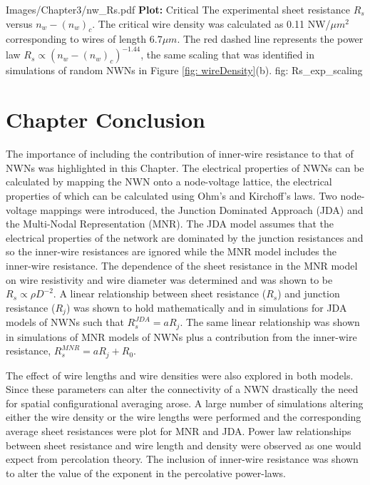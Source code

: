 {Images/Chapter3/nw_Rs.pdf}
{\textbf{Plot:} Critical}
{The experimental sheet resistance $R_s$ versus $n_w - (n_w)_c$. The critical wire density was calculated as 0.11 NW/$\mu m^2$ corresponding to wires of length $6.7 \mu m$. The red dashed line represents the power law  $R_s \propto (n_w - (n_w)_c)^{-1.44}$, the same scaling that was identified in simulations of random NWNs in Figure \ref{fig: wireDensity}(b).}
{fig: Rs_exp_scaling}

\section{Chapter Conclusion}
\label{sec:Conclusion}
The importance of including the contribution of inner-wire resistance to that of NWNs was highlighted in this Chapter. The electrical properties of NWNs can be calculated by mapping the NWN onto a node-voltage lattice, the electrical properties of which can be calculated using Ohm's and Kirchoff's laws. Two node-voltage mappings were introduced, the Junction Dominated Approach (JDA) and the Multi-Nodal Representation (MNR). The JDA model assumes that the electrical properties of the network are dominated by the junction resistances and so the inner-wire resistances are ignored while the MNR model includes the inner-wire resistance. The dependence of the sheet resistance in the MNR model on wire resistivity and wire diameter was determined and was shown to be $R_s \propto \rho D^{-2}$. A linear relationship between sheet resistance ($R_s$) and junction resistance ($R_j$) was shown to hold mathematically and in simulations for JDA models of NWNs such that $R_s^{JDA} = a R_j$. The same linear relationship was shown in simulations of MNR models of NWNs plus a contribution from the inner-wire resistance,  $R_s^{MNR}=a R_j + R_0$. 

The effect of wire lengths and wire densities were also explored in both models. Since these parameters can alter the connectivity of a NWN drastically the need for spatial configurational averaging arose. A large number of simulations altering either the wire density or the wire lengths were performed and the corresponding average sheet resistances were plot for MNR and JDA. Power law relationships between sheet resistance and wire length and density were observed as one would expect from percolation theory. 
The inclusion of inner-wire resistance was shown to alter the value of the exponent in the percolative power-laws.

